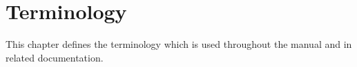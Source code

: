 %
% 
% 
% 
% 
%
%
%
%
%
\chapter{Terminology}
\label{terminology}
\label{chapterm}

This chapter defines the terminology which is used throughout the manual and
in related documentation.

